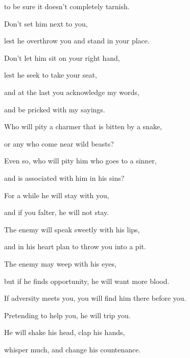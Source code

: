 {\par }{\QB to be sure it doesn’t completely tarnish.
\par }{\Q {}Don’t set him next to you,
\par }{\QB lest he overthrow you and stand in your place.
\par }{\Q Don’t let him sit on your right hand,
\par }{\QB lest he seek to take your seat,
\par }{\Q and at the last you acknowledge my words,
\par }{\QB and be pricked with my sayings.
\par }{\Q {}Who will pity a charmer that is bitten by a snake,
\par }{\QB or any who come near wild beasts?
\par }{\Q {}Even so, who will pity him who goes to a sinner,
\par }{\QB and is associated with him in his sins?
\par }{\Q {}For a while he will stay with you,
\par }{\QB and if you falter, he will not stay.
\par }{\Q {}The enemy will speak sweetly with his lips,
\par }{\QB and in his heart plan to throw you into a pit.
\par }{\Q The enemy may weep with his eyes,
\par }{\QB but if he finds opportunity, he will want more blood.
\par }{\Q {}If adversity meets you, you will find him there before you.
\par }{\QB Pretending to help you, he will trip you.
\par }{\Q {}He will shake his head, clap his hands,
\par }{\QB whisper much, and change his countenance.
\par }{\BB \par }
